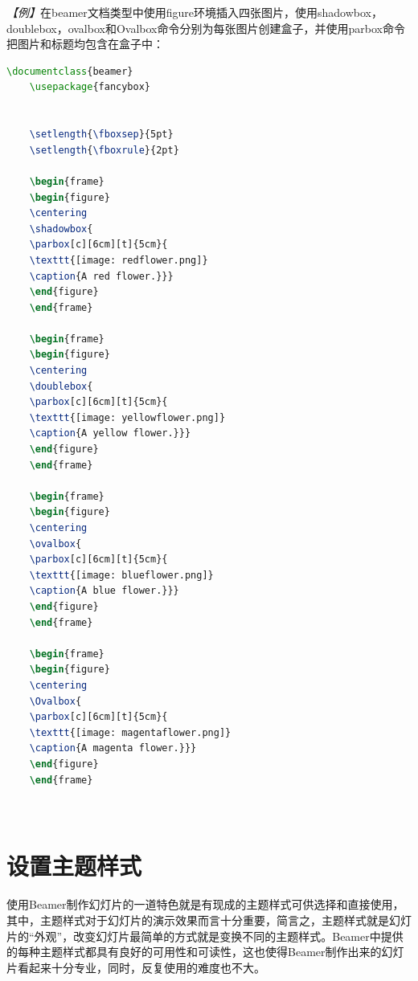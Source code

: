 \emph{【例】}在beamer文档类型中使用figure环境插入四张图片，使用shadowbox，doublebox，ovalbox和Ovalbox命令分别为每张图片创建盒子，并使用parbox命令把图片和标题均包含在盒子中：
\begin{lstlisting}[language=TeX]
    \documentclass{beamer}
    \usepackage{fancybox}
    

    \setlength{\fboxsep}{5pt}
    \setlength{\fboxrule}{2pt}

    \begin{frame}
    \begin{figure}
    \centering
    \shadowbox{
    \parbox[c][6cm][t]{5cm}{
    \texttt{[image: redflower.png]}
    \caption{A red flower.}}}
    \end{figure}
    \end{frame}

    \begin{frame}
    \begin{figure}
    \centering
    \doublebox{
    \parbox[c][6cm][t]{5cm}{
    \texttt{[image: yellowflower.png]}
    \caption{A yellow flower.}}}
    \end{figure}
    \end{frame}

    \begin{frame}
    \begin{figure}
    \centering
    \ovalbox{
    \parbox[c][6cm][t]{5cm}{
    \texttt{[image: blueflower.png]}
    \caption{A blue flower.}}}
    \end{figure}
    \end{frame}

    \begin{frame}
    \begin{figure}
    \centering
    \Ovalbox{
    \parbox[c][6cm][t]{5cm}{
    \texttt{[image: magentaflower.png]}
    \caption{A magenta flower.}}}
    \end{figure}
    \end{frame}

    
\end{lstlisting}

\section{设置主题样式}

使用Beamer制作幻灯片的一道特色就是有现成的主题样式可供选择和直接使用，其中，主题样式对于幻灯片的演示效果而言十分重要，简言之，主题样式就是幻灯片的“外观”，改变幻灯片最简单的方式就是变换不同的主题样式。Beamer中提供的每种主题样式都具有良好的可用性和可读性，这也使得Beamer制作出来的幻灯片看起来十分专业，同时，反复使用的难度也不大。

